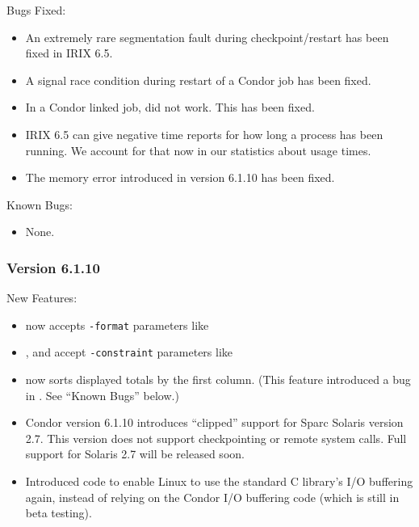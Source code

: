 \noindent Bugs Fixed:

\begin{itemize}

\item An extremely rare segmentation fault during checkpoint/restart has
been fixed in IRIX 6.5.

\item A signal race condition during restart of a Condor job has
been fixed.

\item In a Condor linked job,  did not work. This
has been fixed.

\item IRIX 6.5 can give negative time reports for how long a process has been
running. We account for that now in our statistics about usage times.

\item The  memory error introduced in version 6.1.10
has been fixed.

\end{itemize}

\noindent Known Bugs:

\begin{itemize}

\item None.

\end{itemize}

\subsubsection{\label{sec:New-6-1-10}Version 6.1.10}

\noindent New Features:

\begin{itemize}

\item {} now accepts \texttt{-format} parameters like 

\item {},  and  accept
  \texttt{-constraint} parameters like 

\item {} now sorts displayed totals by the first column.
(This feature introduced a bug in .  See ``Known Bugs''
below.)

\item Condor version 6.1.10 introduces ``clipped'' support for Sparc
Solaris version 2.7.
This version does not support checkpointing or remote system calls.
Full support for Solaris 2.7 will be released soon.

\item Introduced code to enable Linux to use the standard C library's
I/O buffering again, instead of relying on the Condor I/O buffering
code (which is still in beta testing).  

\end{itemize}

